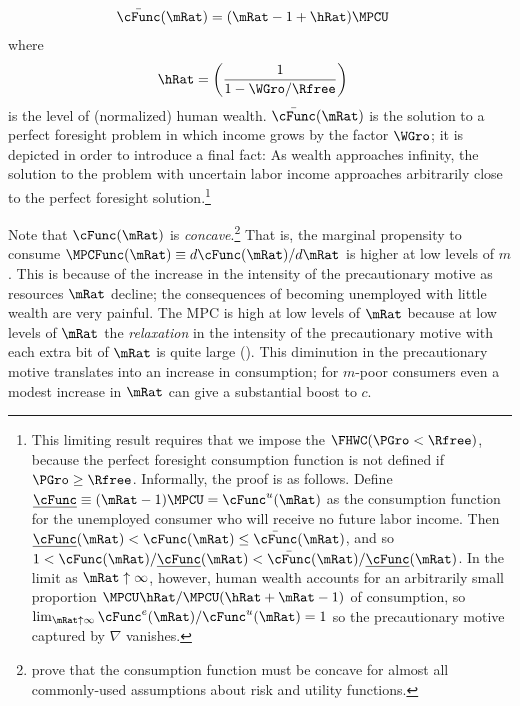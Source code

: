 \documentclass{\handout}
\begin{document}
\begin{equation}\begin{gathered}\begin{aligned}
  \bar{\cFunc}(\mRat) & =  (\mRat-1+\hRat)\MPCU
\end{aligned}\end{gathered}\end{equation}
where
\begin{equation}\begin{gathered}\begin{aligned}
  \hRat & =  \left(\frac{1}{1-\WGro/\Rfree}\right)
\end{aligned}\end{gathered}\end{equation}
is the level of (normalized) human wealth.  $\bar{\cFunc}(\mRat)$ is the solution to a perfect foresight problem in which income grows by the factor $\WGro$; it is depicted in order to introduce a final fact: As wealth approaches infinity, the solution to the problem with uncertain labor income approaches arbitrarily close to the perfect foresight solution.\footnote{This limiting result requires that we impose the $\FHWC (\PGro < \Rfree)$, because the perfect foresight consumption function is not defined if $\PGro \geq \Rfree$.  Informally, the proof is as follows.  Define $\underline{\cFunc} \equiv (\mRat-1)\MPCU=\cFunc^{u}(\mRat)$ as the consumption function for the unemployed consumer who will receive no future labor income.  Then $\underline{\cFunc}(\mRat) < \cFunc(\mRat) \leq \bar{\cFunc}(\mRat)$, and so $1 < \cFunc(\mRat)/\underline{\cFunc}(\mRat)<\bar{\cFunc}(\mRat)/\underline{\cFunc}(\mRat)$. In the limit as $\mRat \uparrow \infty$, however, human wealth accounts for an arbitrarily small proportion $\MPCU \hRat/\MPCU (\hRat+\mRat-1)$ of consumption, so $\lim_{\mRat \uparrow \infty} \cFunc^{e}(\mRat)/\cFunc^{u}(\mRat) = 1$ so the precautionary motive captured by $\nabla$ vanishes.}


Note that $\cFunc(\mRat)$ is {\it concave}.\footnote{\cite{carroll&kimball:concavity} prove that the consumption
function must be concave for almost all commonly-used assumptions about
risk and utility functions.} That is, the marginal propensity to
consume $\MPCFunc(\mRat) \equiv d \cFunc(\mRat)/d \mRat$ is higher at low levels of $m$.  This is because
of the increase in the intensity of the precautionary motive as resources
$\mRat$ decline; the consequences of becoming unemployed with little wealth are very painful.  The MPC is high at low
levels of $\mRat$ because at low levels of $\mRat$ the {\it relaxation} in the
intensity of the precautionary motive with each extra bit of $\mRat$ is quite large (\cite{kimball:smallandlarge}).
This diminution in the precautionary motive translates into an increase
in consumption; for $m$-poor consumers even a modest increase in $\mRat$ can
give a substantial boost to $c$.
\end{document}
